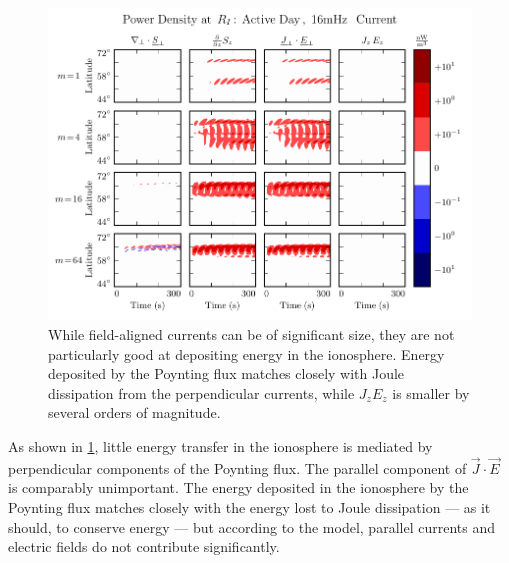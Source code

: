 \begin{figure}[!htb]
    \centering
    \includegraphics[width=\textwidth]{figures/power_density.pdf}
    \caption[Power Density at the Ionosphere]{
      While field-aligned currents can be of significant size, they are not particularly good at depositing energy in the ionosphere. Energy deposited by the Poynting flux matches closely with Joule dissipation from the perpendicular currents, while $J_z E_z$ is smaller by several orders of magnitude. 
    }
    \label{fig_power_density}
\end{figure}

As shown in \cref{fig_power_density}, little energy transfer in the ionosphere is mediated by perpendicular components of the Poynting flux. The parallel component of $\vec{J} \cdot \vec{E}$ is comparably unimportant. The energy deposited in the ionosphere by the Poynting flux matches closely with the energy lost to Joule dissipation --- as it should, to conserve energy --- but according to the model, parallel currents and electric fields do not contribute significantly. 



